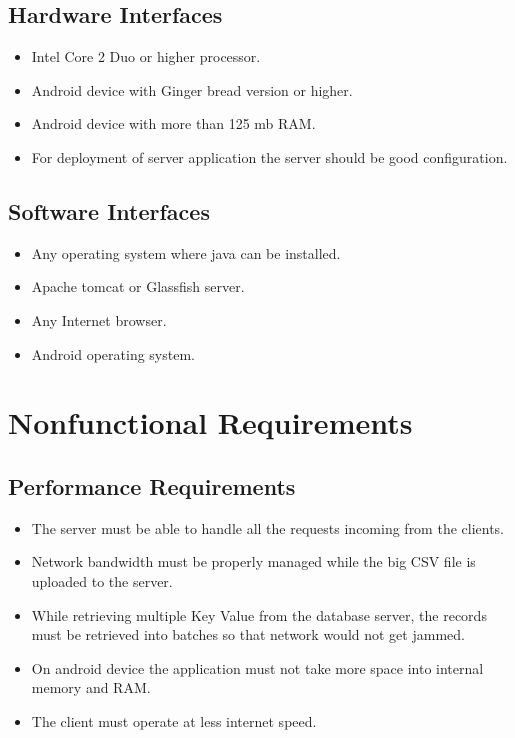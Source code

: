 \subsection{Hardware Interfaces}
\begin{itemize}
  \item Intel Core 2 Duo or higher processor.
  \item Android device with Ginger bread version or higher.
  \item Android device with more than 125 mb RAM.
  \item For deployment of server application the server should be good configuration.
\end{itemize}

\subsection{Software Interfaces}
\begin{itemize}
  \item Any operating system where java can be installed.
  \item Apache tomcat or Glassfish server.
  \item Any Internet browser.
  \item Android operating system.
\end{itemize}

\section{Nonfunctional Requirements}

\subsection{Performance Requirements}
\begin{itemize}
  \item The server must be able to handle all the requests incoming from the clients.
  \item Network bandwidth must be properly managed while the big CSV file is uploaded to the server.
  \item While retrieving multiple Key Value from the database server, the records must be retrieved into batches so that network would not get jammed.
  \item On android device the application must not take more space into internal memory and RAM.
  \item The client must operate at less internet speed.
\end{itemize}

